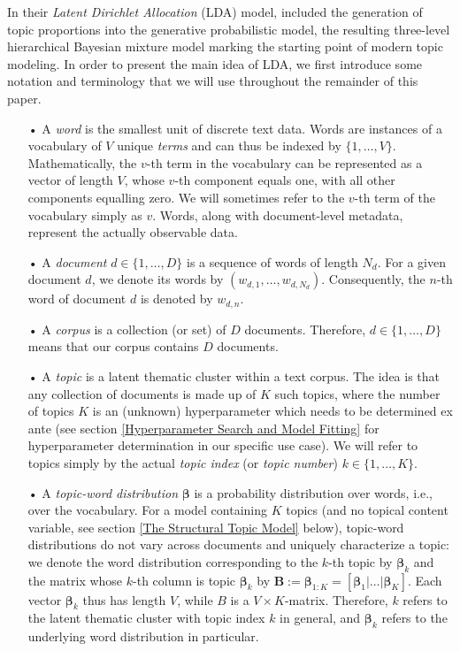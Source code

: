 In their \textit{Latent Dirichlet Allocation} (LDA) model, \cite{blei2003latent} included the generation of topic proportions into the generative probabilistic model, the resulting three-level hierarchical Bayesian mixture model marking the starting point of modern topic modeling. In order to present the main idea of LDA, we first introduce some notation and terminology that we will use throughout the remainder of this paper.

\begin{itemize}
\vspace{-0.25cm}
\item[•] A \textit{word} is the smallest unit of discrete text data. Words are instances of a vocabulary of $V$ unique \textit{terms} and can thus be indexed by $\{1,\dots,V\}$. Mathematically, the $v$-th term in the vocabulary can be represented as a vector of length $V$, whose $v$-th component equals one, with all other components equalling zero. We will sometimes refer to the $v$-th term of the vocabulary simply as $v$. Words, along with document-level metadata, represent the actually observable data.
\vspace{-0.25cm}
\item[•] A \textit{document} $d \in \{1,\dots,D\}$ is a sequence of words of length $N_{d}$. For a given document $d$, we denote its words by $(w_{d,1},\dots,w_{d,N_{d}})$. Consequently, the $n$-th word of document $d$ is denoted by $w_{d,n}$.
\vspace{-0.25cm}
\item[•] A \textit{corpus} is a collection (or set) of $D$ documents. Therefore, $d \in \{1,\dots,D\}$ means that our corpus contains $D$ documents.
\vspace{-0.25cm}
\item[•] A \textit{topic} is a latent thematic cluster within a text corpus. The idea is that any collection of documents is made up of $K$ such topics, where the number of topics $K$ is an (unknown) hyperparameter which needs to be determined ex ante (see section \ref{Hyperparameter Search and Model Fitting} for hyperparameter determination in our specific use case). We will refer to topics simply by the actual \textit{topic index} (or \textit{topic number}) $k \in \{1,\dots,K\}$.
\vspace{-0.25cm}
\item[•] A \textit{topic-word distribution} $\boldsymbol{\beta}$ is a probability distribution over words, i.e., over the vocabulary. For a model containing $K$ topics (and no topical content variable, see section \ref{The Structural Topic Model} below), topic-word distributions do not vary across documents and uniquely characterize a topic: we denote the word distribution corresponding to the $k$-th topic by $\boldsymbol{\beta}_k$ and the matrix whose $k$-th column is topic $\boldsymbol{\beta}_k$ by $\boldsymbol{B}:=\boldsymbol{\beta}_{1:K}=[\boldsymbol{\beta}_1|\dots|\boldsymbol{\beta}_K]$. Each vector $\boldsymbol{\beta}_k$ thus has length $V$, while $B$ is a $V \times K$-matrix. Therefore, $k$ refers to the latent thematic cluster with topic index $k$ in general, and $\boldsymbol{\beta}_k$ refers to the underlying word distribution in particular.

\end{itemize}
